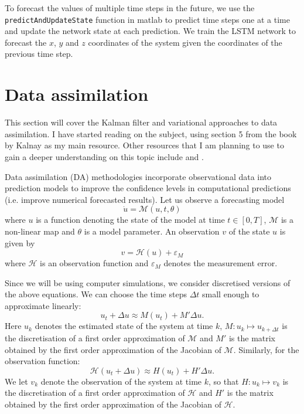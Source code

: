 \documentclass[english]{article}
\renewcommand{\epsilon}{\varepsilon}
\begin{document}
To forecast the values of multiple time steps in the future, we use the \texttt{predictAndUpdateState} function in matlab to predict time steps one at a time and update the network state at each prediction. We train the LSTM network to forecast the $x$, $y$ and $z$ coordinates of the system given the coordinates of the previous time step.

\section{Data assimilation}
This section will cover the Kalman filter and variational approaches to data assimilation. I have started reading on the subject, using section 5 from the book by Kalnay \cite{Kalnay} as my main resource. Other resources that I am planning to use to gain a deeper understanding on this topic include \cite{Asch} and \cite{DARC}.

Data assimilation (DA) methodologies incorporate observational data into prediction models to improve the confidence levels in computational predictions (i.e. improve numerical forecasted results).
Let us observe a forecasting model
\begin{equation}\label{forecasting_model}
	\dot{u} = \mathcal{M}(u,t,\theta)
\end{equation}
where $u$ is a function denoting the state of the model at time $t\in[0,T]$, $\mathcal{M}$ is a non-linear map and $\theta$ is a model parameter.
An observation $v$ of the state $u$ is given by
\begin{equation}\label{observation}
	v = \mathcal{H}(u)+\epsilon_M
\end{equation}
where $\mathcal{H}$ is an observation function and $\epsilon_M$ denotes the measurement error.

Since we will be using computer simulations, we consider discretised versions of the above equations. We can choose the time steps $\Delta t$ small enough to approximate linearly:
\begin{equation}
u_t + \Delta u \approx M(u_t) + M'\Delta u.
\end{equation}
Here $u_k$ denotes the estimated state of the system at time $k$, $M:u_{k}\mapsto u_{k+\Delta t}$ is the discretisation of a first order approximation of $\mathcal{M}$ and $M'$ is the matrix obtained by the first order approximation of the Jacobian of $\mathcal{M}$.
Similarly, for the observation function:
\begin{equation}
\mathcal{H}(u_t +\Delta u) \approx H(u_t) + H'\Delta u.
\end{equation}
We let $v_k$ denote the observation of the system at time $k$, so that $H:u_k\mapsto v_k$ is the discretisation of a first order approximation of $\mathcal{H}$ and $H'$ is the matrix obtained by the first order approximation of the Jacobian of $\mathcal{H}$.
\end{document}
